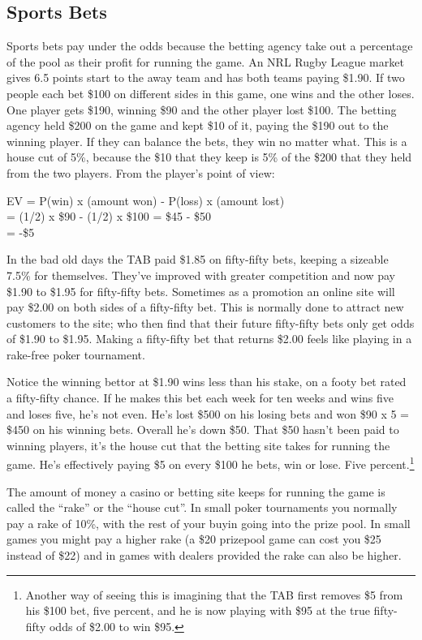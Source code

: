 \subsection*{Sports Bets}
Sports bets pay under the odds because the betting agency take out a
percentage of the pool as their profit for running the game. An NRL
Rugby League market gives 6.5 points start to the away team and has
both teams paying \$1.90. If two people each bet \$100 on different
sides in this game, one wins and the other loses. One player gets
\$190, winning \$90 and the other player lost \$100. The betting
agency held \$200 on the game and kept \$10 of it, paying the \$190
out to the winning player. If they can balance the bets, they win no
matter what. This is a house cut of 5\%, because the \$10 that they
keep is 5\% of the \$200 that they held from the two players. From the
player's point of view:

EV = P(win) x (amount won) - P(loss) x (amount lost) \\
   = (1/2) x \$90 - (1/2) x \$100  = \$45 - \$50  \\
   = -\$5

In the bad old days the TAB paid \$1.85 on fifty-fifty bets, keeping a
sizeable 7.5\% for themselves. They've improved with greater
competition and now pay \$1.90 to \$1.95 for fifty-fifty
bets. Sometimes as a promotion an online site will pay \$2.00 on both
sides of a fifty-fifty bet. This is normally done to attract new
customers to the site; who then find that their future fifty-fifty
bets only get odds of \$1.90 to \$1.95. Making a fifty-fifty bet that
returns \$2.00 feels like playing in a rake-free poker tournament.


Notice the winning bettor at \$1.90 wins less than his stake,
on a footy bet rated a fifty-fifty chance. If he makes this bet each
week for ten weeks and wins five and loses five, he's not even. He's lost
\$500 on his losing bets and won \$90 x 5 = \$450 on his winning bets.
Overall he's down \$50. That \$50 hasn't been paid to winning players,
it's the house cut that the betting site takes for running the game.
He's effectively paying \$5 on every \$100 he bets, win or lose.
Five percent.\footnote{Another way of seeing this is imagining that the
TAB first removes \$5 from his \$100 bet, five percent, and he is now
playing with \$95 at the true fifty-fifty odds of \$2.00 to win \$95.}

The amount of money a casino or betting site keeps for running the
game is called the ``rake'' or the ``house cut''.
In small poker tournaments you normally pay a rake of 10\%, with the
rest of your buyin going into the prize pool. In small games you might
pay a higher rake (a \$20 prizepool game can cost you \$25 instead of
\$22) and in games with dealers provided the rake can also be higher.


